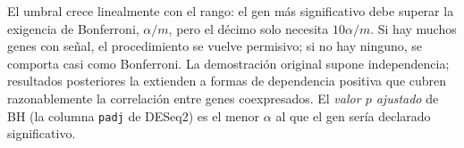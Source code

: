\begin{simbolos}
\end{simbolos}

El umbral crece linealmente con el rango: el gen más significativo debe superar la exigencia de Bonferroni, $\alpha/m$, pero el décimo solo necesita $10\alpha/m$. Si hay muchos genes con señal, el procedimiento se vuelve permisivo; si no hay ninguno, se comporta casi como Bonferroni. La demostración original supone independencia; resultados posteriores la extienden a formas de dependencia positiva que cubren razonablemente la correlación entre genes coexpresados. El \emph{valor $p$ ajustado} de BH (la columna \texttt{padj} de DESeq2) es el menor $\alpha$ al que el gen sería declarado significativo.

